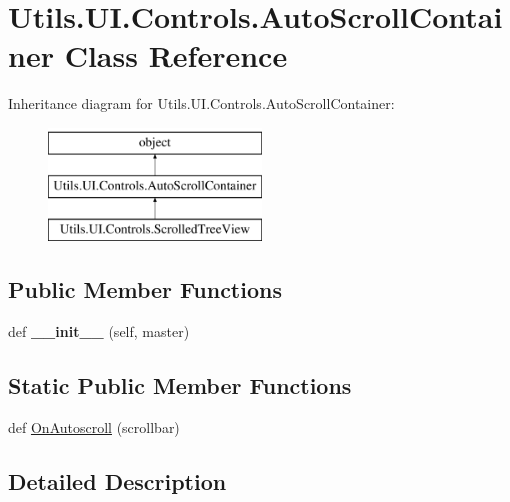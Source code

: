 \hypertarget{class_c_utils_1_1_utils_1_1_u_i_1_1_controls_1_1_auto_scroll_container}{}\section{Utils.\+U\+I.\+Controls.\+Auto\+Scroll\+Container Class Reference}
\label{class_c_utils_1_1_utils_1_1_u_i_1_1_controls_1_1_auto_scroll_container}
Inheritance diagram for Utils.\+U\+I.\+Controls.\+Auto\+Scroll\+Container\+:\begin{figure}[H]
\begin{center}
\leavevmode
\includegraphics[height=3.000000cm]{class_c_utils_1_1_utils_1_1_u_i_1_1_controls_1_1_auto_scroll_container}
\end{center}
\end{figure}
\subsection*{Public Member Functions}
\begin{DoxyCompactItemize}
\item 
\mbox{\label{class_c_utils_1_1_utils_1_1_u_i_1_1_controls_1_1_auto_scroll_container_aa7a4e2c13d6198a41bbf8f878589394b}} 
def {\bfseries \+\_\+\+\_\+init\+\_\+\+\_\+} (self, master)
\end{DoxyCompactItemize}
\subsection*{Static Public Member Functions}
\begin{DoxyCompactItemize}
\item 
def \hyperlink{class_c_utils_1_1_utils_1_1_u_i_1_1_controls_1_1_auto_scroll_container_a94fb94a578671e4db721caa0034bee9a}{On\+Autoscroll} (scrollbar)
\end{DoxyCompactItemize}


\subsection{Detailed Description}


